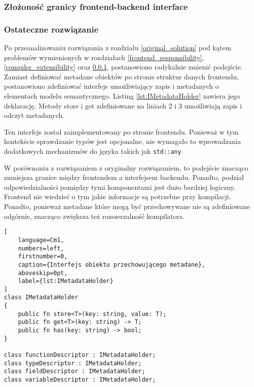 \subsubsection{Złożoność granicy frontend-backend interface} \label{frontend_backend_complexity}

\subsubsection{Ostateczne rozwiązanie}\label{final_solution}
Po przeanalizowaniu rozwiązania z rozdziału \ref{original_solution} pod kątem problemów wymienionych w rozdziałach \ref{frontend_responsibility}, \ref{compiler_extensibility} oraz \ref{frontend_backend_complexity}, postanowiono radykalnie zmienić podejście.
Zamiast definiować metadane obiektów po stronie struktur danych frontendu, postanowiono zdefiniować interfejs umożliwiający zapis i metadanych o elementach modelu semantycznego. 
Listing \ref{lst:IMetadataHolder} zawiera jego deklarację.
Metody store i get zdefiniowane na liniach 2 i 3 umożliwiają zapis i odczyt metadanych.

Ten interfejs został zaimplementowany po stronie frontendu.
Ponieważ w tym kontekście sprawdzanie typów jest opcjonalne, nie wymagało to wprowadzania dodatkowych mechanizmów do języka takich jak \texttt{std::any}.

W porównaniu z rozwiązaniem z oryginalny rozwiązaniem, to podejście znacząco zmniejsza granice między frontendem a interfejsem backendu.
Ponadto, podział odpowiedzialności pomiędzy tymi komponentami jest dużo bardziej logiczny.
Frontend nie wiedzieć o tym jakie informacje są potrzebne przy kompilacji.
Ponadto, ponieważ metadane które mogą być przechowywane nie są zdefiniowane odgórnie, znacząco zwiększa też rozszerzalność kompilatora.

\begin{lstlisting}[
    language=Cm1,
    numbers=left,
    firstnumber=0,
    caption={Interfejs obiektu przechowującego metadane},
    aboveskip=0pt,
    label={lst:IMetadataHolder}
]
class IMetadataHolder
{
    public fn store<T>(key: string, value: T);
    public fn get<T>(key: string) -> T;
    public fn has(key: string) -> bool;
}

class functionDescriptor : IMetadataHolder;
class typeDescriptor : IMetadataHolder;
class fieldDescriptor : IMetadataHolder;
class variableDescriptor : IMetadataHolder;
\end{lstlisting}